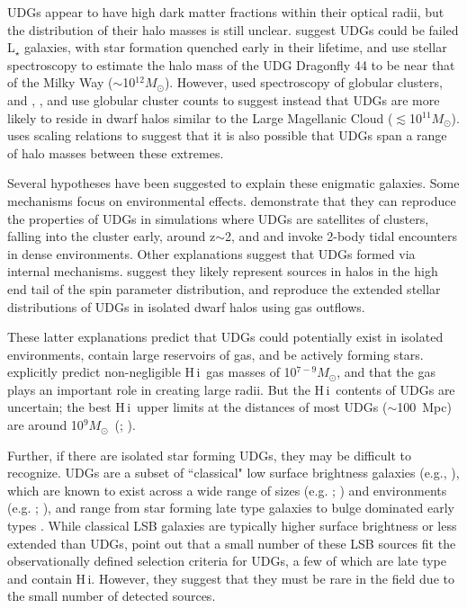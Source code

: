 \documentclass[twocolumn]{aastex6}
\newcommand{\msun}{M_{\odot}}
\def\msun{$M_\odot$}
\newcommand{\hi}{H{\sc\,i}}
\begin{document}
UDGs appear to have high dark matter fractions within their optical radii, but the distribution of their halo masses is still unclear. \cite{vandokkum15a}  suggest UDGs could be failed L$_{\star}$ galaxies, with star formation quenched early in their lifetime, and \cite{vandokkum16a}  use stellar spectroscopy to estimate the halo mass of the UDG Dragonfly 44 to be near that of the Milky Way ($\sim$10$^{12}$\msun). However, \cite{beasley16a} used spectroscopy of globular clusters, and  \cite{peng16a}, \cite{beasley16b}, and \cite{amorisco16b} use globular cluster counts to suggest instead that UDGs are more likely to reside in dwarf halos similar to the Large Magellanic Cloud ($\lesssim$10$^{11}$\msun). \cite{zaritsky16a} uses scaling relations to suggest that it is also possible that UDGs span a range of halo masses between these extremes. 

Several hypotheses have been suggested to explain these enigmatic galaxies. Some mechanisms focus on environmental effects. \cite{yozin15a} demonstrate that they can reproduce the properties of UDGs in simulations where UDGs are satellites of clusters, falling into the cluster early, around z$\sim$2, and \cite{baushev16a} and \cite{burkert16a} invoke 2-body tidal encounters in dense environments. Other explanations suggest that UDGs formed via internal mechanisms.
\cite{amorisco16a} suggest they likely represent sources in halos in the high end tail of the spin parameter distribution, and \cite{dicintio16a} reproduce the extended stellar distributions of UDGs in isolated dwarf halos using gas outflows.%

These latter explanations predict that UDGs could potentially exist in isolated environments, 
 contain large reservoirs of gas, and be actively forming stars. \cite{dicintio16a} explicitly predict non-negligible \hi\ gas masses of 10$^{7-9}$\msun, and that the gas plays an important role in creating large radii. But the \hi\ contents of UDGs are uncertain; the best \hi\ upper limits at the distances of most UDGs ($\sim$100~Mpc) are around 10$^9$\msun\ (\citealp{haynes11a}; \citealp{martinez-delgado16a}).

Further, if there are isolated star forming UDGs, they may be difficult to recognize. UDGs are a subset of ``classical" low surface brightness galaxies (e.g., \citealp{schombert92a}), which are known to exist across a wide range of sizes (e.g. \citealp{zucker06a}; \citealp{bothun87a}) and environments (e.g. \citealp{impey88a}; \citealp{impey96a}), and range from star forming late type galaxies \citep{mcgaugh95a} to bulge dominated early types \citep{beijersbergen99a}. While classical LSB galaxies are typically higher surface brightness or less extended than UDGs, \cite{yagi16a} point out that a small number of these LSB sources fit the observationally defined selection criteria for UDGs, a few of which are late type and contain \hi. However, they suggest that they must be rare in the field due to the small number of detected sources.
\end{document}
